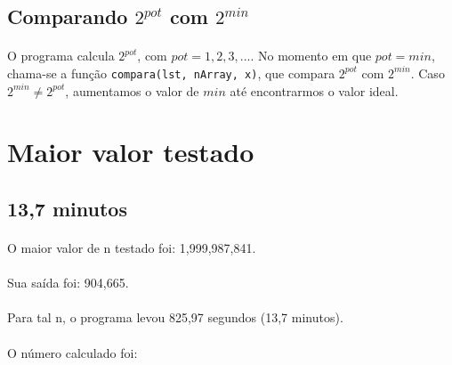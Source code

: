 \documentclass[10pt,a4paper]{article}
\begin{document}
	\subsection{Comparando $2^{pot}$ com $2^{min}$}
		\paragraph*{} O programa calcula $2^{pot}$, com $pot = 1, 2, 3, ...$. No momento em que $pot = min$, chama-se a função {\tt compara(lst, nArray, x)}, que compara $2^{pot}$ com $2^{min}$. Caso $2^{min} \neq 2^{pot}$, aumentamos o valor de $min$ até encontrarmos o valor ideal.
\section{Maior valor testado}
	\subsection{13,7 minutos}
		\paragraph*{} O maior valor de n testado foi: 1,999,987,841.
		\paragraph*{} Sua saída foi: 904,665.
		\paragraph*{} Para tal n, o programa levou 825,97 segundos (13,7 minutos).
		\paragraph*{} O número calculado foi:
\newpage
\end{document}
